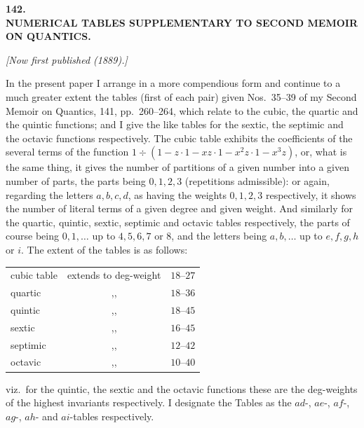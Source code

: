 \documentclass[11pt]{article}
\begin{document}
\bigskip\bigskip
\begin{center}
{\Large\bfseries 142.}\\[1ex]
{\large\bfseries NUMERICAL TABLES SUPPLEMENTARY TO SECOND MEMOIR\\ ON QUANTICS.}
\end{center}

\medskip
\noindent\textit{[Now first published (1889).]}

\medskip

\noindent In the present paper I arrange in a more compendious form and continue to a much greater extent the tables (first of each pair) given Nos.~35--39 of my Second Memoir on Quantics, 141, pp.~260--264, which relate to the cubic, the quartic and the quintic functions; and I give the like tables for the sextic, the septimic and the octavic functions respectively. The cubic table exhibits the coefficients of the several terms of the function $1\div(1-z\cdot 1-xz\cdot 1-x^2 z\cdot 1-x^3 z)$, or, what is the same thing, it gives the number of partitions of a given number into a given number of parts, the parts being $0, 1, 2, 3$ (repetitions admissible): or again, regarding the letters $a, b, c, d$, as having the weights $0, 1, 2, 3$ respectively, it shows the number of literal terms of a given degree and given weight. And similarly for the quartic, quintic, sextic, septimic and octavic tables respectively, the parts of course being $0, 1, \ldots$ up to $4, 5, 6, 7$ or $8$, and the letters being $a, b, \ldots$ up to $e, f, g, h$ or $i$. The extent of the tables is as follows:
\begin{center}
\begin{tabular}{lcc}
cubic table & extends to deg-weight & $18$--$27$ \\
quartic     & ,,                    & $18$--$36$ \\
quintic     & ,,                    & $18$--$45$ \\
sextic      & ,,                    & $16$--$45$ \\
septimic    & ,,                    & $12$--$42$ \\
octavic     & ,,                    & $10$--$40$
\end{tabular}
\end{center}
viz.\ for the quintic, the sextic and the octavic functions these are the deg-weights of the highest invariants respectively. I designate the Tables as the $ad$-, $ae$-, $af$-, $ag$-, $ah$- and $ai$-tables respectively.
\end{document}
